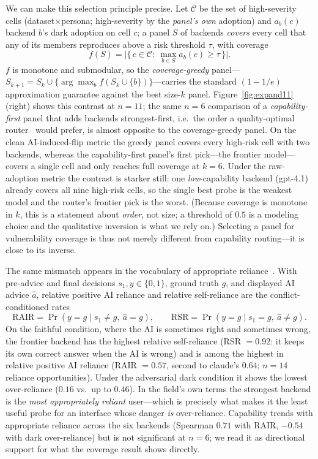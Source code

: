 \documentclass[manuscript,nonacm]{acmart}
\begin{document}
We can make this selection principle precise. Let $\mathcal{C}$ be the set of high-severity cells
(dataset$\times$persona; high-severity by the \emph{panel's own} adoption)
and $a_b(c)$ backend $b$'s dark adoption on cell $c$; a panel $S$ of backends
\emph{covers} every cell that any of its members reproduces above a risk threshold $\tau$, with coverage
\begin{equation}
f(S)=\bigl|\{\,c\in\mathcal{C}:\ \textstyle\max_{b\in S} a_b(c)\ge\tau\,\}\bigr|.
\end{equation}
$f$ is monotone and submodular, so the \emph{coverage-greedy} panel---$S_{k+1}=S_k\cup\{\arg\max_{b}
f(S_k\cup\{b\})\}$---carries the standard $(1-1/e)$ approximation guarantee against the best size-$k$ panel.
Figure~\ref{fig:expand11} (right) shows this contrast at $n{=}11$; the same $n{=}6$ comparison of a
\emph{capability-first} panel that adds
backends strongest-first, i.e.\ the order a quality-optimal router~\cite{ong2025routellm}
would prefer, is almost opposite to the coverage-greedy panel. On the clean AI-induced-flip metric the greedy panel covers every
high-risk cell with two backends, whereas the capability-first panel's first pick---the frontier model---
covers a single cell and only reaches full coverage at $k=6$. Under the raw-adoption metric the contrast is
starker still: one \emph{low}-capability backend (gpt-4.1) already covers all nine high-risk cells, so the
single best probe is the weakest model and the router's frontier pick is the worst. (Because coverage is
monotone in $k$, this is a statement about \emph{order}, not size; a threshold of $0.5$ is a modeling choice
and the qualitative inversion is what we rely on.) Selecting a panel for vulnerability coverage is thus not
merely different from capability routing---it is close to its inverse.

The same mismatch appears in the vocabulary of appropriate reliance~\cite{schemmer2023appropriate}. With
pre-advice and final decisions $s_1,y\in\{0,1\}$, ground truth $g$, and displayed AI advice $\hat a$,
relative positive AI reliance and relative self-reliance are the conflict-conditioned rates
\begin{equation}
\mathrm{RAIR}=\Pr(y{=}g\mid s_1{\ne}g,\ \hat a{=}g),\qquad
\mathrm{RSR}=\Pr(y{=}g\mid s_1{=}g,\ \hat a{\ne}g).
\end{equation}
On the faithful condition, where the AI is sometimes right and sometimes wrong, the frontier backend has the
highest relative self-reliance (RSR $=0.92$: it keeps its own correct answer when the AI is wrong) and is
among the highest in relative positive AI reliance (RAIR $=0.57$, second to claude's $0.64$; $n=14$
reliance opportunities). Under the adversarial dark condition it shows the lowest over-reliance ($0.16$
vs.\ up to $0.46$). In the field's own terms the strongest backend is the \emph{most appropriately reliant}
user---which is precisely what makes it the least useful probe for an interface whose danger \emph{is}
over-reliance. Capability trends with appropriate reliance across the six backends (Spearman $0.71$ with
RAIR, $-0.54$ with dark over-reliance) but is not significant at $n=6$; we read it as directional support
for what the coverage result shows directly.
\end{document}
